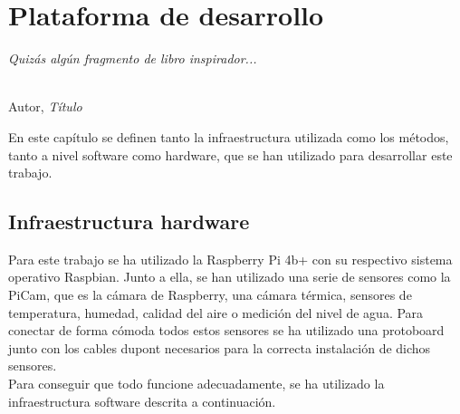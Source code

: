 \chapter{Plataforma de desarrollo}
\label{cap:capitulo3}

\begin{flushright}
\begin{minipage}[]{10cm}
\emph{Quizás algún fragmento de libro inspirador...}\\
\end{minipage}\\

Autor, \textit{Título}\\
\end{flushright}

\vspace{1cm}

En este capítulo se definen tanto la infraestructura utilizada como los métodos, tanto a nivel software como hardware, que se han utilizado para desarrollar este trabajo.\\

\section{Infraestructura hardware}
\label{sec:hw}
Para este trabajo se ha utilizado la Raspberry Pi 4b+ con su respectivo sistema operativo Raspbian. Junto a ella, se han utilizado una serie de sensores como la PiCam, que es la cámara de Raspberry, una cámara térmica, sensores de temperatura, humedad, calidad del aire o medición del nivel de agua. Para conectar de forma cómoda todos estos sensores se ha utilizado una protoboard junto con los cables dupont necesarios para la correcta instalación de dichos sensores.\\
Para conseguir que todo funcione adecuadamente, se ha utilizado la infraestructura software descrita a continuación.\\
 
